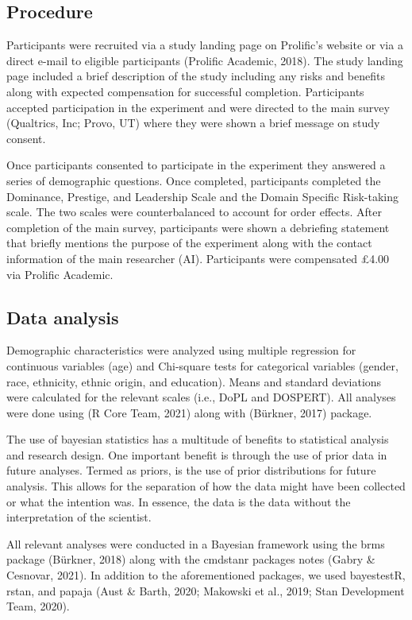 \documentclass[
  donotrepeattitle,doc, 12pt, a4paper,floatsintext]{apa7}
\begin{document}
\hypertarget{procedure-2}{%
\subsection{Procedure}\label{procedure-2}}

Participants were recruited via a study landing page on Prolific's website or via a direct e-mail to eligible participants (Prolific Academic, 2018). The study landing page included a brief description of the study including any risks and benefits along with expected compensation for successful completion. Participants accepted participation in the experiment and were directed to the main survey (Qualtrics, Inc; Provo, UT) where they were shown a brief message on study consent.

Once participants consented to participate in the experiment they answered a series of demographic questions. Once completed, participants completed the Dominance, Prestige, and Leadership Scale and the Domain Specific Risk-taking scale. The two scales were counterbalanced to account for order effects. After completion of the main survey, participants were shown a debriefing statement that briefly mentions the purpose of the experiment along with the contact information of the main researcher (AI). Participants were compensated £4.00 via Prolific Academic.

\hypertarget{data-analysis-2}{%
\subsection{Data analysis}\label{data-analysis-2}}

Demographic characteristics were analyzed using multiple regression for continuous variables (age) and Chi-square tests for categorical variables (gender, race, ethnicity, ethnic origin, and education). Means and standard deviations were calculated for the relevant scales (i.e., DoPL and DOSPERT). All analyses were done using (R Core Team, 2021) along with (Bürkner, 2017) package.

The use of bayesian statistics has a multitude of benefits to statistical analysis and research design. One important benefit is through the use of prior data in future analyses. Termed as priors, is the use of prior distributions for future analysis. This allows for the separation of how the data might have been collected or what the intention was. In essence, the data is the data without the interpretation of the scientist.

All relevant analyses were conducted in a Bayesian framework using the brms package (Bürkner, 2018) along with the cmdstanr packages notes (Gabry \& Cesnovar, 2021). In addition to the aforementioned packages, we used bayestestR, rstan, and papaja (Aust \& Barth, 2020; Makowski et al., 2019; Stan Development Team, 2020).
\end{document}
